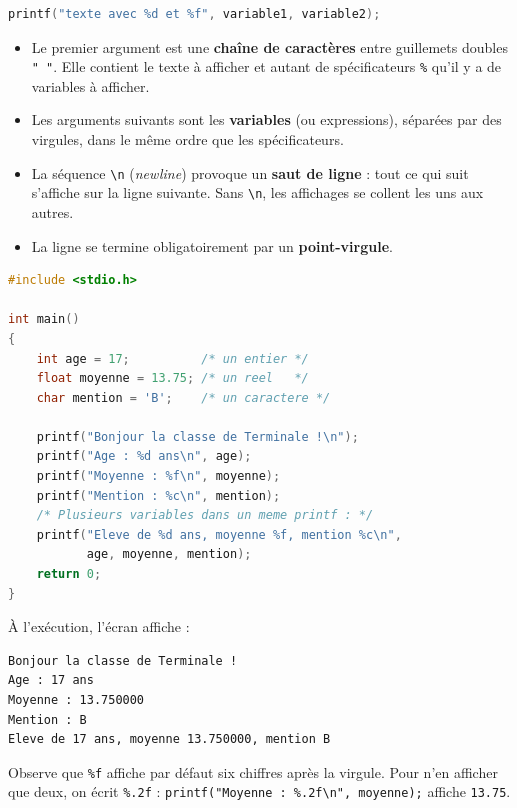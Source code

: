 \documentclass[11pt]{article}
\begin{document}
\begin{propriete}
\begin{lstlisting}[language=C]
printf("texte avec %d et %f", variable1, variable2);
\end{lstlisting}
\begin{itemize}
\item Le premier argument est une \textbf{chaîne de caractères} entre guillemets doubles \texttt{" "}. Elle contient le texte à afficher et autant de spécificateurs \texttt{\%} qu'il y a de variables à afficher.
\item Les arguments suivants sont les \textbf{variables} (ou expressions), séparées par des virgules, dans le même ordre que les spécificateurs.
\item La séquence \texttt{\textbackslash n} (\emph{newline}) provoque un \textbf{saut de ligne} : tout ce qui suit s'affiche sur la ligne suivante. Sans \texttt{\textbackslash n}, les affichages se collent les uns aux autres.
\item La ligne se termine obligatoirement par un \textbf{point-virgule}.
\end{itemize}
\end{propriete}

\begin{exemplebox}
\begin{lstlisting}[language=C]
#include <stdio.h>

int main()
{
    int age = 17;          /* un entier */
    float moyenne = 13.75; /* un reel   */
    char mention = 'B';    /* un caractere */

    printf("Bonjour la classe de Terminale !\n");
    printf("Age : %d ans\n", age);
    printf("Moyenne : %f\n", moyenne);
    printf("Mention : %c\n", mention);
    /* Plusieurs variables dans un meme printf : */
    printf("Eleve de %d ans, moyenne %f, mention %c\n",
           age, moyenne, mention);
    return 0;
}
\end{lstlisting}
À l'exécution, l'écran affiche :
\begin{lstlisting}
Bonjour la classe de Terminale !
Age : 17 ans
Moyenne : 13.750000
Mention : B
Eleve de 17 ans, moyenne 13.750000, mention B
\end{lstlisting}
Observe que \texttt{\%f} affiche par défaut six chiffres après la virgule. Pour n'en afficher que deux, on écrit \texttt{\%.2f} : \texttt{printf("Moyenne : \%.2f\textbackslash n", moyenne);} affiche \texttt{13.75}.
\end{exemplebox}
\end{document}
